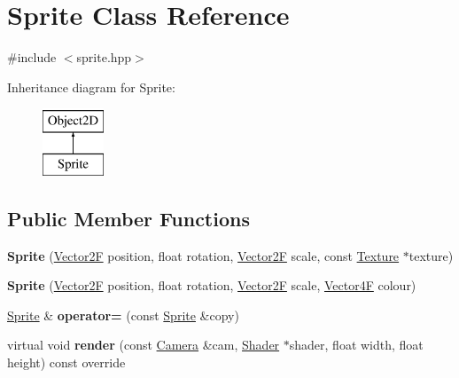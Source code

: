 \hypertarget{class_sprite}{}\section{Sprite Class Reference}
\label{class_sprite}


{\ttfamily \#include $<$sprite.\+hpp$>$}

Inheritance diagram for Sprite\+:\begin{figure}[H]
\begin{center}
\leavevmode
\includegraphics[height=2.000000cm]{class_sprite}
\end{center}
\end{figure}
\subsection*{Public Member Functions}
\begin{DoxyCompactItemize}
\item 
\mbox{\label{class_sprite_a555482129461dfe0f4f296ea2e78f153}} 
{\bfseries Sprite} (\mbox{\hyperlink{class_vector2}{Vector2F}} position, float rotation, \mbox{\hyperlink{class_vector2}{Vector2F}} scale, const \mbox{\hyperlink{class_texture}{Texture}} $\ast$texture)
\item 
\mbox{\label{class_sprite_ac32f104ca4bc443adbdfc53bec082a34}} 
{\bfseries Sprite} (\mbox{\hyperlink{class_vector2}{Vector2F}} position, float rotation, \mbox{\hyperlink{class_vector2}{Vector2F}} scale, \mbox{\hyperlink{class_vector4}{Vector4F}} colour)
\item 
\mbox{\label{class_sprite_a2937195112c58787f249689324456c9f}} 
\mbox{\hyperlink{class_sprite}{Sprite}} \& {\bfseries operator=} (const \mbox{\hyperlink{class_sprite}{Sprite}} \&copy)
\item 
\mbox{\label{class_sprite_a93a83d6c6941cff4036c50110d1b1ec4}} 
virtual void {\bfseries render} (const \mbox{\hyperlink{class_camera}{Camera}} \&cam, \mbox{\hyperlink{class_shader}{Shader}} $\ast$shader, float width, float height) const override
\end{DoxyCompactItemize}
